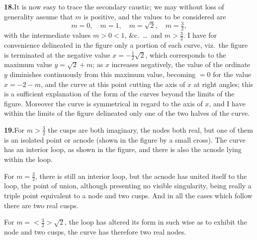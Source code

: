\documentclass[11pt]{article}
\begin{document}
\textbf{18.}\quad It is now easy to trace the secondary caustic; we may without loss of generality assume that $m$ is positive, and the values to be considered are
\[
m = 0,\quad m = 1,\quad m = \sqrt{2},\quad m = \tfrac{3}{2},
\]
with the intermediate values $m > 0 < 1$, \&c.\ \ldots\ and $m > \tfrac{3}{2}$. I have for convenience delineated in the figure only a portion of each curve, viz.\ the figure is terminated at the negative value $x = -\tfrac{1}{2}\sqrt{2}$, which corresponds to the maximum value $y = \sqrt{2} + m$; as $x$ increases negatively, the value of the ordinate $y$ diminishes continuously from this maximum value, becoming $= 0$ for the value $x = -2 - m$, and the curve at this point cutting the axis of $x$ at right angles; this is a sufficient explanation of the form of the curves beyond the limits of the figure. Moreover the curve is symmetrical in regard to the axis of $x$, and I have within the limits of the figure delineated only one of the two halves of the curve.

\textbf{19.}\quad For $m > \tfrac{3}{2}$ the cusps are both imaginary, the nodes both real, but one of them is an isolated point or acnode (shown in the figure by a small cross). The curve has an interior loop, as shown in the figure, and there is also the acnode lying within the loop.

For $m = \tfrac{3}{2}$, there is still an interior loop, but the acnode has united itself to the loop, the point of union, although presenting no visible singularity, being really a triple point equivalent to a node and two cusps. And in all the cases which follow there are two real cusps.

For $m = < \tfrac{3}{2} > \sqrt{2}$, the loop has altered its form in such wise as to exhibit the node and two cusps, the curve has therefore two real nodes.
\end{document}
